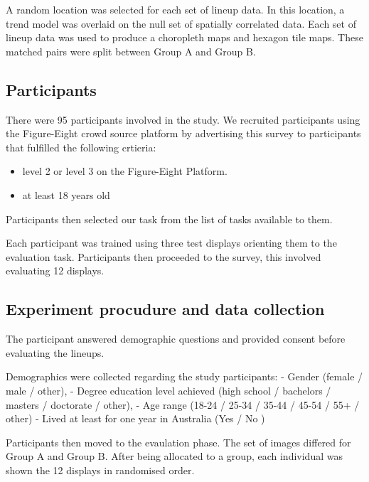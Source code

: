 \documentclass[conference,final,]{IEEEtran}
\providecommand{\tightlist}{%
  \setlength{\itemsep}{0pt}\setlength{\parskip}{0pt}}
\begin{document}
A random location was selected for each set of lineup data. In this
location, a trend model was overlaid on the null set of spatially
correlated data. Each set of lineup data was used to produce a
choropleth maps and hexagon tile maps. These matched pairs were split
between Group A and Group B.

\hypertarget{participants}{%
\subsection{Participants}\label{participants}}

There were 95 participants involved in the study. We recruited
participants using the Figure-Eight crowd source platform by advertising
this survey to participants that fulfilled the following crtieria:

\begin{itemize}
\tightlist
\item
  level 2 or level 3 on the Figure-Eight Platform.
\item
  at least 18 years old
\end{itemize}

Participants then selected our task from the list of tasks available to
them.

Each participant was trained using three test displays orienting them to
the evaluation task. Participants then proceeded to the survey, this
involved evaluating 12 displays.

\hypertarget{experiment-procudure-and-data-collection}{%
\subsection{Experiment procudure and data
collection}\label{experiment-procudure-and-data-collection}}

The participant answered demographic questions and provided consent
before evaluating the lineups.

Demographics were collected regarding the study participants: - Gender
(female / male / other), - Degree education level achieved (high school
/ bachelors / masters / doctorate / other), - Age range (18-24 / 25-34 /
35-44 / 45-54 / 55+ / other) - Lived at least for one year in Australia
(Yes / No )

Participants then moved to the evaulation phase. The set of images
differed for Group A and Group B. After being allocated to a group, each
individual was shown the 12 displays in randomised order.
\end{document}
